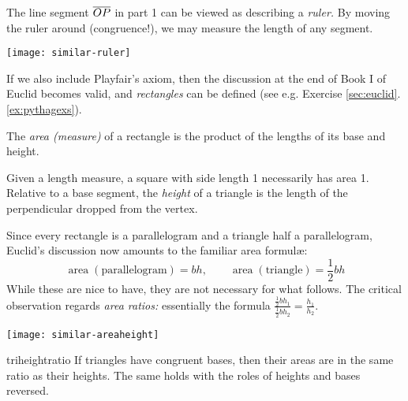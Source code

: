\begin{minipage}[t]{0.49\linewidth}\vspace{0pt}
The line segment $\overline{OP}$ in part 1 can be viewed as describing a \emph{ruler.} By moving the ruler around (congruence!), we may measure the length of any segment.
\end{minipage}\hfill\begin{minipage}[t]{0.49\linewidth}\vspace{0pt}
\flushright\texttt{[image: similar-ruler]}
\end{minipage}


\goodbreak


If we also include Playfair's axiom, then the discussion at the end of Book I of Euclid becomes valid, and \emph{rectangles} can be defined (see e.g.{} Exercise \ref*{sec:euclid}.\ref{ex:pythagexs}).

\begin{defn}{}{}
The \emph{area (measure)} of a rectangle is the product of the lengths of its base and height.
\end{defn}

Given a length measure, a square with side length 1 necessarily has area 1. Relative to a base segment, the \emph{height} of a triangle is the length of the perpendicular dropped from the vertex.\par

\begin{minipage}[t]{0.8\linewidth}\vspace{0pt}
Since every rectangle is a parallelogram and a triangle half a parallelogram, Euclid's discussion now amounts to the familiar area formulæ:
\[\operatorname{area}(\text{parallelogram})=bh,\qquad \operatorname{area}(\text{triangle})=\frac 12bh\]
While these are nice to have, they are not necessary for what follows. The critical observation regards \emph{area ratios:} essentially the formula $\frac{\frac 12bh_1}{\frac 12bh_2}=\frac{h_1}{h_2}$.
\end{minipage}\hfill\begin{minipage}[t]{0.19\linewidth}\vspace{0pt}
\flushright\texttt{[image: similar-areaheight]}
\end{minipage}



\begin{lemm}{}{triheightratio}
If triangles have congruent bases, then their areas are in the same ratio as their heights. The same holds with the roles of heights and bases reversed.
\end{lemm} 


